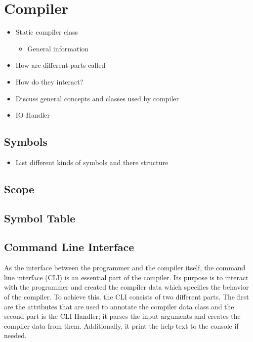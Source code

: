 \section{Compiler}
\begin{itemize}
    \item Static compiler class
    \begin{itemize}
        \item General information
    \end{itemize}
    \item How are different parts called
    \item How do they interact?
    \item Discuss general concepts and classes used by compiler
    \item IO Handler
\end{itemize}

\subsection{Symbols}
\begin{itemize}
    \item List different kinds of symbols and there structure
\end{itemize}

\subsection{Scope}

\subsection{Symbol Table}

\subsection{Command Line Interface}
As the interface between the programmer and the compiler itself, the command line interface (CLI) is an essential part of the compiler. 
Its purpose is to interact with the programmer and created the compiler data which specifies the behavior of the compiler. 
To achieve this, the CLI consists of two different parts. The first are the attributes that are used to annotate the compiler data class and the second part is the CLI Handler; it parses the input arguments and creates the compiler data from them. Additionally, it print the help text to the console if needed.

